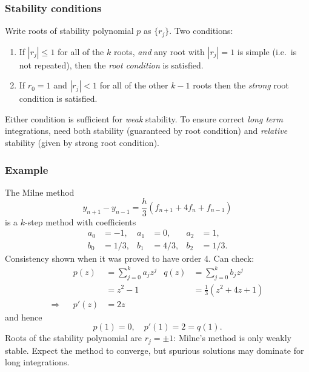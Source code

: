\documentclass{beamer}
\begin{document}
\begin{frame}
  \frametitle{Stability conditions}

  Write roots of stability polynomial $p$ as $\{r_j\}$. Two
  conditions:
  \begin{enumerate}
  \item If $ | r_j | \leq 1$ for all of the $k$ roots, \emph{and} any
    root with $|r_j| = 1$ is simple (i.e.\ is not repeated), then the
    \emph{root condition} is satisfied. \pause
  \item If $r_0 = 1$ and $ | r_j | < 1$ for all of the other $k-1$
    roots then the \emph{strong} root condition is satisfied.
  \end{enumerate} \pause

  \vspace{1ex}

  Either condition is sufficient for \emph{weak} stability. To ensure
  correct \emph{long term} integrations, need both stability
  (guaranteed by root condition) and \emph{relative} stability (given
  by strong root condition).

\end{frame}

\begin{frame}
  \frametitle{Example}

  \begin{overlayarea}{\textwidth}{0.9\textheight}
    {
      The Milne method
      \begin{equation*}
        y_{n+1} - y_{n-1} = \frac{h}{3} \left( f_{n+1} + 4 f_{n} + f_{n-1} \right)
      \end{equation*}
      is a $k$-step method with coefficients
    }
    \begin{align*}
      a_0 & = -1, & a_1 & = 0, & a_2 & = 1, \\
      b_0 & = 1/3, & b_1 & = 4/3, & b_2 & = 1/3.
    \end{align*}
    {
      Consistency shown when it was proved to have
      order 4. Can check:
    }
    {
      \begin{align*}
        &&    p(z) & = \sum_{j=0}^k a_j z^j & q(z) & = \sum_{j=0}^k b_j z^j \\
        && & = z^2 - 1 && = \tfrac{1}{3} \left( z^2 + 4 z + 1 \right)
        \\
        \Rightarrow && p'(z) & = 2 z
      \end{align*}
    }
    {
      and hence
      \begin{equation*}
        p(1)  = 0, \quad
        p'(1)  = 2 = q(1).
      \end{equation*}
    }
    {
      Roots of the stability polynomial are $r_j = \pm 1$: Milne's
      method is only weakly stable.
    }
    {
      Expect the method to converge, but spurious solutions may
      dominate for long integrations.
    }
  \end{overlayarea}
\end{frame}
\end{document}
